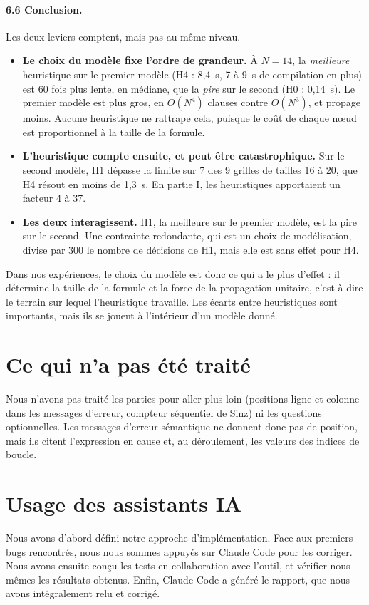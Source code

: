 \documentclass[11pt,a4paper]{article}
\begin{document}
\paragraph{6.6 Conclusion.} Les deux leviers comptent, mais pas au même niveau.
\begin{itemize}
  \item \textbf{Le choix du modèle fixe l'ordre de grandeur.} À $N = 14$, la \emph{meilleure}
        heuristique sur le premier modèle (H4 : 8,4~s, 7 à 9~s de compilation en plus) est
        60 fois plus lente, en médiane, que la \emph{pire} sur le second (H0 : 0,14~s). Le premier modèle
        est plus gros, en $O(N^4)$ clauses contre $O(N^3)$, et propage moins. Aucune
        heuristique ne rattrape cela, puisque le coût de chaque nœud est proportionnel à la
        taille de la formule.
  \item \textbf{L'heuristique compte ensuite, et peut être catastrophique.} Sur le second
        modèle, H1 dépasse la limite sur 7 des 9 grilles de tailles 16 à 20, que H4 résout en
        moins de 1,3~s. En partie I, les heuristiques apportaient un facteur 4 à 37.
  \item \textbf{Les deux interagissent.} H1, la meilleure sur le premier modèle, est la pire
        sur le second. Une contrainte redondante, qui est un choix de modélisation, divise par
        300 le nombre de décisions de H1, mais elle est sans effet pour H4.
\end{itemize}
Dans nos expériences, le choix du modèle est donc ce qui a le plus d'effet : il détermine la
taille de la formule et la force de la propagation unitaire, c'est-à-dire le terrain sur
lequel l'heuristique travaille. Les écarts entre heuristiques sont importants, mais ils se
jouent à l'intérieur d'un modèle donné.

\section*{Ce qui n'a pas été traité}
Nous n'avons pas traité les parties \og pour aller plus loin \fg{} (positions ligne et colonne
dans les messages d'erreur, compteur séquentiel de Sinz) ni les questions optionnelles.
Les messages d'erreur sémantique ne donnent donc pas de position, mais ils citent
l'expression en cause et, au déroulement, les valeurs des indices de boucle.

\section*{Usage des assistants IA}
 Nous avons d'abord défini notre approche d'implémentation.
 Face aux premiers bugs rencontrés, nous nous sommes appuyés sur Claude Code pour les corriger. 
 Nous avons ensuite conçu les tests en collaboration avec l'outil, et vérifier nous-mêmes les résultats obtenus. 
 Enfin, Claude Code a généré le rapport, que nous avons intégralement relu et corrigé.
\end{document}

